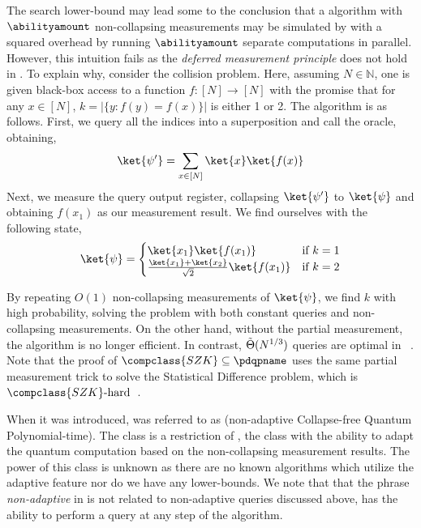 The search lower-bound may lead some to the conclusion that a \pdqpname algorithm with $\abilityamount$ non-collapsing measurements may be simulated by \bqpname with a squared overhead by running $\abilityamount$ separate computations in parallel. However, this intuition fails as the \emph{deferred measurement principle} does not hold in \pdqpname. To explain why, consider the collision problem. Here, assuming $N\in \mathbb{N}$, one is given black-box access to a function $f:[N] \rightarrow [N]$ with the promise that for any $x\in [N]$, $k = |\{y: f(y)=f(x)\}|$ is either 1 or 2. The algorithm is as follows. First, we query all the indices into a superposition and call the oracle, obtaining,
\begin{align*}
    \ket{\psi^\prime}=\sum_{x\in [N]} \ket{x}\ket{f(x)}
\end{align*}
Next, we measure the query output register, collapsing $\ket{\psi^\prime}$ to $\ket{\psi}$ and obtaining $f(x_1)$ as our measurement result. We find ourselves with the following state,
\begin{align*}
    \ket{\psi} = \begin{cases}
        \ket{x_1}\ket{f(x_1)} &\text{if }k=1\\
        \frac{\ket{x_1} + \ket{x_2}}{\sqrt{2}}\ket{f(x_1)} &\text{if }k=2
    \end{cases}
\end{align*}

By repeating $O(1)$ non-collapsing measurements of $\ket{\psi}$, we find $k$ with high probability, solving the problem with both constant queries and non-collapsing measurements. On the other hand, without the partial measurement, the algorithm is no longer efficient. In contrast, $\Tilde{\Theta}(N^{1/3})$ queries are optimal in \bqpname~\cite{collision_problem_algorithm, collision_element_distinctness_lower_bound}. Note that the proof of $\compclass{SZK}\subseteq \pdqpname$ uses the same partial measurement trick to solve the Statistical Difference problem, which is $\compclass{SZK}\text{-hard}$~\cite{szk_hard_problem}.

When it was introduced, \pdqpname was referred to as  (non-adaptive Collapse-free Quantum Polynomial-time). The class  is a restriction of , the class with the ability to adapt the quantum computation based on the non-collapsing measurement results. The power of this class is unknown as there are no known algorithms which utilize the adaptive feature nor do we have any lower-bounds. We note that that the phrase \emph{non-adaptive} in  is not related to non-adaptive queries discussed above,  has the ability to perform a query at any step of the algorithm.

